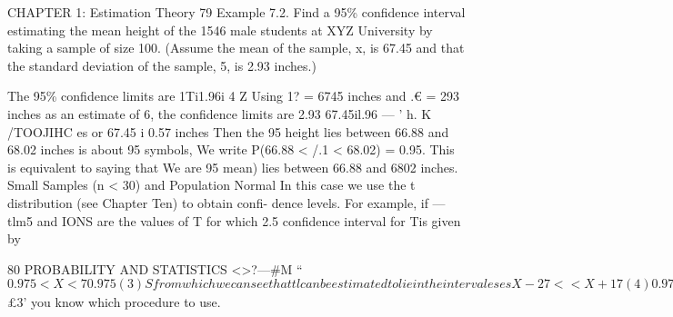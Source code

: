 
CHAPTER 1: Estimation Theory 79
Example 7.2. Find a 95\% conﬁdence interval estimating the mean height of the 1546 male students at XYZ University by taking a sample of size 100. (Assume the mean of the sample, x, is 67.45 and that the
standard deviation of the sample, 5, is 2.93 inches.)

The 95\% conﬁdence limits are 1Ti1.96i 4
\/Z
Using 1? = 6745 inches and .€ = 293 inches as an estimate of 6, the
conﬁdence limits are
2.93
67.45il.96 — ' h.
K /TOOJIHC es
or
67.45 i 0.57 inches
Then the 95%
height lies between 66.88 and 68.02 inches is about 95%
symbols, We write P(66.88 < /.1 < 68.02) = 0.95. This is equivalent to
saying that We are 95%
mean) lies between 66.88 and 6802 inches.
Small Samples (n < 30) and Population Normal
In this case we use the t distribution (see Chapter Ten) to obtain conﬁ-
dence levels. For example, if —tlm5 and IONS are the values of T for
which 2.5%
conﬁdence interval for Tis given by



80 PROBABILITY AND STATISTICS
<>?—#M
“$0.975 < X < 70.975 (3)
S
from which we can see that tl can be estimated to lie in the interval
e s e s
X -2 7 < < X +1 7 (4)
0.975 V? F1 0.975 ‘/Z
with 95%
means are given by
_ 5
X it 7 5)
C x/Z (
where the t‘ values can be read from Appendix C.
A comparison of (5) with (1) shows that for small samples We
replace zc, by Z‘, For n > 30, zt‘ and tr are practically equal. It should be
noted that an advantage of the small sampling theory (Which can of
course be used for large samples as well, i.e., it is exact) in that S appears
in (5) so that the sample standard deviation can be used instead of the
population standard deviation (Which is usually unknown) as in (1).
Sample size is very important! We con- I struct different confidence inten/als I //1
based on sample size, so make sure *3-_,$ £3’
you know which procedure to use.



